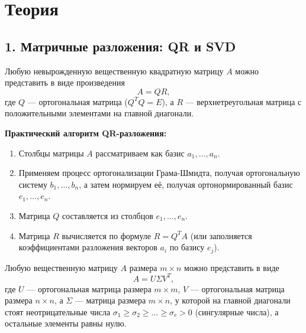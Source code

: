 \section*{Теория}

\subsection*{1. Матричные разложения: QR и SVD}

\begin{theorem}[QR-разложение]
Любую невырожденную вещественную квадратную матрицу $A$ можно представить в виде произведения
\[
A = QR,
\]
где $Q$ — ортогональная матрица ($Q^T Q = E$), а $R$ — верхнетреугольная матрица с положительными элементами на главной диагонали.
\end{theorem}

\noindent\textbf{Практический алгоритм QR-разложения:}
\begin{enumerate}
    \item Столбцы матрицы $A$ рассматриваем как базис $a_1, \dots, a_n$.
    \item Применяем процесс ортогонализации Грама-Шмидта, получая ортогональную систему $b_1, \dots, b_n$, а затем нормируем её, получая ортонормированный базис $e_1, \dots, e_n$.
    \item Матрица $Q$ составляется из столбцов $e_1, \dots, e_n$.
    \item Матрица $R$ вычисляется по формуле $R = Q^T A$ (или заполняется коэффициентами разложения векторов $a_i$ по базису $e_j$).
\end{enumerate}

\begin{theorem}
Любую вещественную матрицу $A$ размера $m \times n$ можно представить в виде
\[
A = U \Sigma V^T,
\]
где $U$ — ортогональная матрица размера $m \times m$, $V$ — ортогональная матрица размера $n \times n$, а $\Sigma$ — матрица размера $m \times n$, у которой на главной диагонали стоят неотрицательные числа $\sigma_1 \ge \sigma_2 \ge \dots \ge \sigma_r > 0$ (сингулярные числа), а остальные элементы равны нулю.
\end{theorem}

